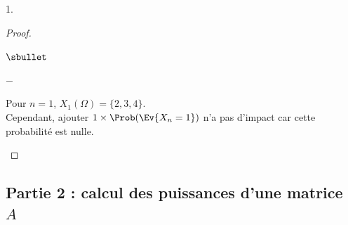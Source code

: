 \begin{noliste}{1.}
\begin{proof}
\begin{noliste}{$\sbullet$}
\begin{noliste}{$-$}
      \item Pour $n = 1$, $X_1(\Omega) = \{2, 3, 4\}$.\\
        Cependant, ajouter $1 \times \Prob(\Ev{X_n = 1})$ n'a pas
        d'impact car cette probabilité est nulle.\\[-1.1cm]
      \end{noliste}
    \end{noliste}
  \end{proof}

\end{noliste}

\subsection*{Partie 2 : calcul des puissances d'une matrice $A$}

